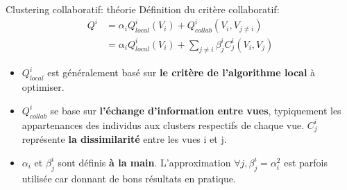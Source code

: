\documentclass[hyperref={pdfpagelabels=false}]{beamer}
\begin{document}

    \begin{frame}{Clustering collaboratif: théorie}
        Définition du critère collaboratif:
        \begin{align}
            Q^i &= \alpha_i Q^i_{local}(V_i) + Q^i_{collab}(V_i, V_{j\neq i})\\
            &= \alpha_i Q^i_{local}(V_i) + \sum_{j\neq i} \beta^i_j C_j^i(V_i, 
            V_j)
        \end{align}
        \begin{itemize}
            \item $Q^i_{local}$ est généralement basé sur \textbf{le critère de 
                l'algorithme local} à optimiser.
            \item $Q^i_{collab}$ se base sur \textbf{l'échange d'information 
                entre vues}, typiquement les appartenances des individus aux 
                clusters respectifs de chaque vue. $C_j^i$ représente \textbf{la 
                dissimilarité} entre les vues i et j.
            \item $\alpha_i$ et $\beta_j^i$ sont définis \textbf{à la main}.  
                L'approximation $\forall j, \beta_j^i = \alpha_i^2$ est parfois 
                utilisée car donnant de bons résultats en pratique.
        \end{itemize}
    \end{frame}
\end{document}
